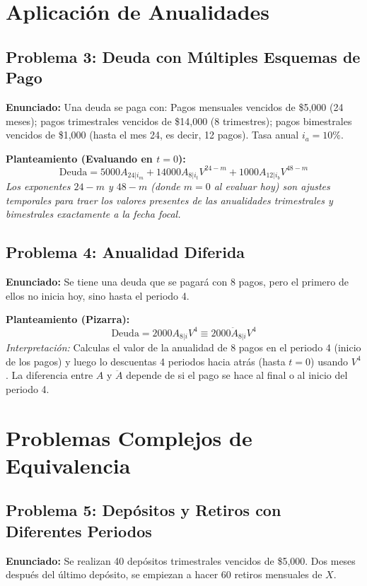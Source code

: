 \documentclass[12pt,a4paper]{article}
\begin{document}
\newpage
\section{Aplicación de Anualidades}

\subsection*{Problema 3: Deuda con Múltiples Esquemas de Pago}
\textbf{Enunciado:} Una deuda se paga con: Pagos mensuales vencidos de \$5,000 (24 meses); pagos trimestrales vencidos de \$14,000 (8 trimestres); pagos bimestrales vencidos de \$1,000 (hasta el mes 24, es decir, 12 pagos). Tasa anual \(i_a = 10\%\).

\textbf{Planteamiento (Evaluando en \(t=0\)):}
\[
\text{Deuda} = 5000 A_{24|i_m} + 14000 A_{8|i_t} V^{24-m} + 1000 A_{12|i_b} V^{48-m}
\]
\textit{Los exponentes \(24-m\) y \(48-m\) (donde \(m=0\) al evaluar hoy) son ajustes temporales para traer los valores presentes de las anualidades trimestrales y bimestrales exactamente a la fecha focal.}

\subsection*{Problema 4: Anualidad Diferida}
\textbf{Enunciado:} Se tiene una deuda que se pagará con 8 pagos, pero el primero de ellos no inicia hoy, sino hasta el periodo 4.

\textbf{Planteamiento (Pizarra):}
\[
\text{Deuda} = 2000 A_{8|i} V^4 \equiv 2000 \ddot{A}_{8|i} V^4
\]
\textit{Interpretación:} Calculas el valor de la anualidad de 8 pagos en el periodo 4 (inicio de los pagos) y luego lo descuentas 4 periodos hacia atrás (hasta \(t=0\)) usando \(V^4\). La diferencia entre \(A\) y \(\ddot{A}\) depende de si el pago se hace al final o al inicio del periodo 4.

\section{Problemas Complejos de Equivalencia}

\subsection*{Problema 5: Depósitos y Retiros con Diferentes Periodos}
\textbf{Enunciado:} Se realizan 40 depósitos trimestrales vencidos de \$5,000. Dos meses después del último depósito, se empiezan a hacer 60 retiros mensuales de \(X\).
\end{document}
